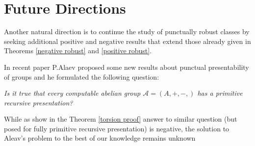 \documentclass{pracalicmgr2025}
\theoremstyle{plain}            %
\theoremstyle{remark}           %
\theoremstyle{definition}       %
\begin{document}
\section*{Future Directions}

Another natural direction is to continue the study of punctually robust classes by seeking additional positive and negative results that extend those already given in Theorems \ref{negative robust} and \ref{positive robust}.


In recent paper \cite{Alaev2025} P.Alaev proposed some new results about punctual presentability of groups and he formulated the following question:
\begin{center}
    \textit{Is it true that every computable abelian group $\mathcal{A} = (A, +, -,)$ has a primitive recursive presentation?}
\end{center}
While as show in the Theorem \ref{torsion proof} answer to similar question (but posed for fully primitive recursive presentation) is negative, the solution to Aleav's problem to the best of our knowledge remains unknown




\end{document}
